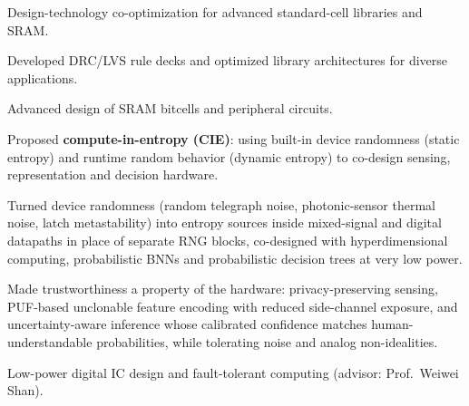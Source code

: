\documentclass[10pt,letterpaper]{article}
\begin{document}
\begin{bullets}
  \item Design-technology co-optimization for advanced standard-cell libraries and SRAM.
  \item Developed DRC/LVS rule decks and optimized library architectures for diverse applications.
\end{bullets}

\begin{bullets}
  \item Advanced design of SRAM bitcells and peripheral circuits.
\end{bullets}

\begin{bullets}
  \item Proposed \textbf{compute-in-entropy (CIE)}: using built-in device randomness (static entropy) and runtime
        random behavior (dynamic entropy) to co-design sensing, representation and decision hardware.
  \item Turned device randomness (random telegraph noise, photonic-sensor thermal noise, latch metastability) into entropy
        sources inside mixed-signal and digital datapaths in place of separate RNG blocks, co-designed with
        hyperdimensional computing, probabilistic BNNs and probabilistic decision trees at very low power.
  \item Made trustworthiness a property of the hardware: privacy-preserving sensing, PUF-based unclonable feature encoding
        with reduced side-channel exposure, and uncertainty-aware inference whose calibrated confidence matches
        human-understandable probabilities, while tolerating noise and analog non-idealities.
\end{bullets}

\begin{bullets}
  \item Low-power digital IC design and fault-tolerant computing (advisor: Prof.\ Weiwei Shan).
\end{bullets}

\end{document}
